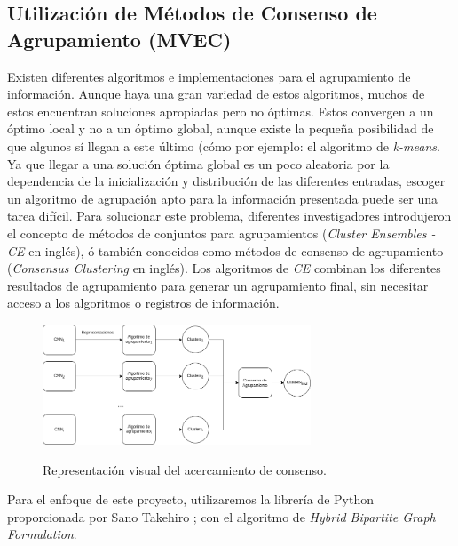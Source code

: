\documentclass[letterpaper, 10 pt, conference]{ieeeconf}  %
\begin{document}
    \subsection{Utilización de Métodos de Consenso de Agrupamiento (MVEC)}
    Existen diferentes algoritmos e implementaciones para el agrupamiento de información. Aunque
    haya una gran variedad de estos algoritmos, muchos de estos encuentran soluciones apropiadas
    pero no óptimas. Estos convergen a un óptimo local y no a un óptimo global, aunque existe
    la pequeña posibilidad de que algunos sí llegan a este último (cómo por ejemplo: el algoritmo
    de \textit{k-means}. Ya que llegar a una solución óptima global es un poco aleatoria por la
    dependencia de la inicialización y distribución de las diferentes entradas, escoger un
    algoritmo de agrupación apto para la información presentada puede ser una tarea difícil. Para
    solucionar este problema, diferentes investigadores introdujeron el concepto de métodos de
    conjuntos para agrupamientos (\textit{Cluster Ensembles - CE} en inglés), ó también conocidos
    como métodos de consenso de agrupamiento (\textit{Consensus Clustering} en inglés). Los
    algoritmos de \textit{CE} combinan los diferentes resultados de agrupamiento para generar un
    agrupamiento final, sin necesitar acceso a los algoritmos o registros de información.
    \cite{Golalipour2021}

    \begin{figure}[ht]
        \centering
        \includegraphics[width=8cm]{./figs/mvec.png}
        \label{fig: MVEC}
        \caption{Representación visual del acercamiento de consenso.}
    \end{figure}


    Para el enfoque de este proyecto, utilizaremos la librería de Python proporcionada por Sano
    Takehiro \cite{Sano_ClusterEnsembles_2021}; con el algoritmo de \textit{Hybrid Bipartite Graph
    Formulation}. \cite{Fern2004}
\end{document}
